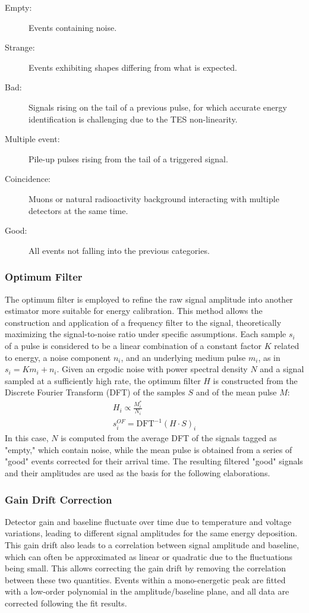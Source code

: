 \begin{description}
\item[Empty:] Events containing noise.
\item[Strange:] Events exhibiting shapes differing from what is expected. 
\item[Bad:] Signals rising on the tail of a previous pulse, for which accurate energy identification is challenging due to the TES non-linearity.
\item[Multiple event:] Pile-up pulses rising from the tail of a triggered signal.
\item[Coincidence:] Muons or natural radioactivity background interacting with multiple detectors at the same time.
\item[Good:] All events not falling into the previous categories.
\end{description}

\subsubsection*{Optimum Filter}
The optimum filter is employed to refine the raw signal amplitude into another estimator more suitable for energy
calibration. This method allows the construction and application of a frequency filter to the signal, theoretically
maximizing the signal-to-noise ratio under specific assumptions. Each sample $s_i$ of a pulse is considered to be a
linear combination of a constant factor $K$ related to energy, a noise component $n_i$, and an underlying medium pulse $m_i$, as in $s_i = K m_i + n_i$. Given an ergodic noise with power spectral density $N$ and a signal sampled at a sufficiently high rate, the optimum filter $H$ is constructed from the Discrete Fourier Transform (DFT) of the samples $S$ and of the mean pulse $M$:
\begin{eqnarray}
 H_i \propto \frac{M_i^*}{N_i}\\
s^{OF}_i = \text{DFT}^{-1}(H \cdot S)_i
\end{eqnarray}
In this case, $N$ is computed from the average DFT of the signals tagged as "empty," which contain noise, while the mean pulse is obtained from a series of "good" events corrected for their arrival time. The resulting filtered "good" signals and their amplitudes are used as the basis for the following elaborations.

\subsubsection*{Gain Drift Correction}
Detector gain and baseline fluctuate over time due to temperature and voltage variations, leading to different signal
amplitudes for the same energy deposition. This gain drift also leads to a correlation between signal amplitude and
baseline, which can often be approximated as linear or quadratic due to the fluctuations being small. This allows
correcting the gain drift by removing the correlation between these two quantities. Events within a mono-energetic peak are fitted with a low-order polynomial in the amplitude/baseline plane, and all data are corrected following the fit results.

